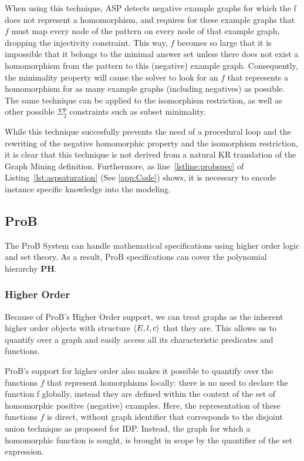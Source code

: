 When using this technique, ASP detects negative example graphs for which the f does not represent a homomorphism, and requires for these example graphs that $f$ must map every node of the pattern on every node of that example graph, dropping the injectivity constraint.
This way, $f$ becomes so large that it is impossible that it belongs to the minimal answer set unless there does not exist a homomorphism from the pattern to this (negative) example graph.
Consequently, the minimality property will cause the solver to look for an $f$ that represents a homomorphism for as many example graphs (including negatives) as possible.
The same technique can be applied to the isomorphism restriction, as well as other possible $\Sigma_{2}^{p}$ constraints such as subset minimality.


While this technique succesfully prevents the need of a procedural loop and the rewriting of the negative homomorphic property and the isomorphism restriction, it is clear that this technique is not derived from a natural KR translation of the Graph Mining definition.
Furthermore, as line~\ref{lstline:probspec} of Listing~\ref{lst:aspsaturation} (See \ref{app:Code}) shows, it is necessary to encode instance specific knowledge into the modeling.

\subsection{ProB}
The ProB System can handle mathematical specifications using higher order logic and set theory.
As a result, ProB specifications can cover the polynomial hierarchy \textbf{PH}.

\subsubsection{Higher Order}
Because of ProB's Higher Order support, we can treat graphs as the inherent higher order objects with structure $\langle E,l,c \rangle$ that they are.
This allows us to quantify over a graph and easily access all its characteristic predicates and functions.

ProB's support for higher order also makes it possible to quantify over the functions $f$ that represent homorphisms locally: there is no need to declare the function f globally, instead they are defined within the context of the set of homomorphic positive (negative) examples.
Here, the representation of these functions $f$ is direct, without graph identifier that corresponds to the disjoint union technique as proposed for IDP.
Instead, the graph  for which a homomorphic function is sought, is brought in scope by the quantifier of the set expression.


